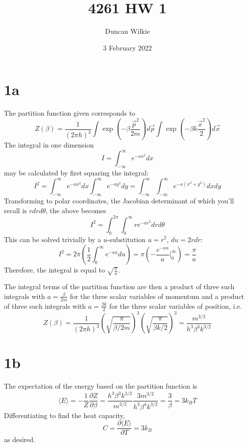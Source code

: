 \documentclass{article}
\title{4261 HW 1}
\author{Duncan Wilkie}
\date{3 February 2022}
\begin{document}
\maketitle

\section*{1a}
The partition function given corresponds to
\[Z(\beta)=\frac{1}{(2\pi h)^3}\int \exp\left( -\beta\frac{\vec{p}^2}{2m} \right)d\vec{p}\int \exp\left( -\beta k\frac{\vec{x}^2}{2} \right)d\vec{x}\]
The integral in one dimension
\[I=\int_{-\infty}^\infty e^{-ax^2}dx\]
may be calculated by first squaring the integral:
\[I^2=\int_{-\infty}^\infty e^{-ax^2}dx\int_{-\infty}^\infty e^{-ay^2}dy=\int_{-\infty}^\infty\int_{-\infty}^\infty e^{-a(x^2+y^2)}dxdy\]
Transforming to polar coordinates, the Jacobian determinant of which you'll recall is $rdrd\theta$, the above becomes
\[I^2=\int_{0}^{2\pi}\int_0^\infty re^{-ar^2}drd\theta\]
This can be solved trivially by a $u$-substitution $u=r^2$, $du=2rdr$:
\[I^2=2\pi\left( \frac{1}{2}\int_0^\infty e^{-au}du\right)=\pi\left( -\frac{e^{-au}}{a}\bigg|_0^\infty \right)=\frac{\pi}{a}\]
Therefore, the integral is equal to $\sqrt{\frac{\pi}{a}}$.

The integral terms of the partition function are then a product of three such integrals with $a=\frac{\beta}{2m}$ for the three scalar variables of momentum and a product of three such integrals with $a=\frac{\beta k}{2}$ for the three scalar variables of position, i.e.
\[Z(\beta)=\frac{1}{(2\pi h)^3}\left( \sqrt{\frac{\pi}{\beta/2m}} \right)^3\left( \sqrt{\frac{\pi}{\beta k/2}} \right)^3=\frac{m^{3/2}}{h^3\beta^3k^{3/2}}\]

\section*{1b}
The expectation of the energy based on the partition function is
\[\langle E \rangle=-\frac{1}{Z}\frac{\partial Z}{\partial \beta}=\frac{h^3\beta^3k^{3/2}}{m^{3/2}}\frac{3m^{3/2}}{h^3\beta^4k^{3/2}}=\frac{3}{\beta}=3k_BT\]
Differentiating to find the heat capacity,
\[C=\frac{\partial \langle E \rangle}{\partial T}=3k_B\]
as desired.
\end{document}

